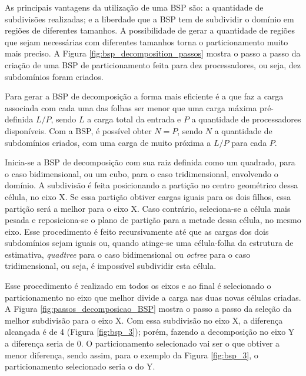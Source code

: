As principais vantagens da utilização de uma BSP são: a quantidade de subdivisões realizadas; e a liberdade que a BSP tem de subdividir o domínio em regiões de diferentes tamanhos. A possibilidade de gerar a quantidade de regiões que sejam necessárias com diferentes tamanhos torna o particionamento muito mais preciso. A Figura \ref{fig:bsp_decomposition_passos} mostra o passo a passo da criação de uma BSP de particionamento feita para dez processadores, ou seja, dez subdomínios foram criados.

Para gerar a BSP de decomposição a forma mais eficiente é a que faz a carga associada com cada uma das folhas ser menor que uma carga máxima pré-definida $L/P$, sendo $L$ a carga total da entrada e $P$ a quantidade de processadores disponíveis. Com a BSP, é possível obter $N=P$, sendo $N$ a quantidade de subdomínios criados, com uma carga de muito próxima a $L/P$ para cada $P$.

Inicia-se a BSP de decomposição com sua raiz definida como um quadrado, para o caso bidimensional, ou um cubo, para o caso tridimensional, envolvendo o domínio. A subdivisão é feita posicionando a partição no centro geométrico dessa célula, no eixo X. Se essa partição obtiver cargas iguais para os dois filhos, essa partição será a melhor para o eixo X. Caso contrário, seleciona-se a célula mais pesada e reposiciona-se o plano de partição para a metade dessa célula, no mesmo eixo. Esse procedimento é feito recursivamente até que as cargas dos dois subdomínios sejam iguais ou, quando atinge-se uma célula-folha da estrutura de estimativa, \textit{quadtree} para o caso bidimensional ou \textit{octree} para o caso tridimensional, ou seja, é impossível subdividir esta célula.

Esse procedimento é realizado em todos os eixos e ao final é selecionado o particionamento no eixo que melhor divide a carga nas duas novas células criadas. A Figura \ref{fig:passos_decomposicao_BSP} mostra o passo a passo da seleção da melhor subdivisão para o eixo X. Com essa subdivisão no eixo X, a diferença alcançada é de 4 (Figura \ref{fig:bsp_3}); porém, fazendo a decomposição no eixo Y a diferença seria de $0$. O particionamento selecionado vai ser o que obtiver a menor diferença, sendo assim, para o exemplo da Figura \ref{fig:bsp_3}, o particionamento selecionado seria o do Y.


